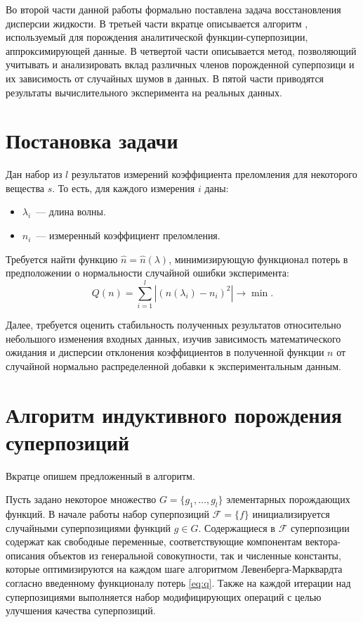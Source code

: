 \documentclass[12pt,a4paper]{article}
\begin{document}
Во второй части данной работы формально поставлена задача восстановления дисперсии
жидкости. В третьей части вкратце описывается алгоритм \cite{Rudoy13}, используемый
для порождения аналитической функции-суперпозиции, аппроксимирующей данные. В четвертой части
описывается метод, позволяющий учитывать и анализировать вклад различных членов
порожденной суперпозици и их зависимость от случайных шумов в данных. В пятой части
приводятся результаты вычислительного эксперимента на реальных данных.

\section{Постановка задачи}

Дан набор из $l$ результатов измерений коэффициента преломления для некоторого
вещества $s$. То есть, для каждого измерения $i$ даны:
\begin{itemize}
  \item $\lambda_i$~--- длина волны.
  \item $n_i$~--- измеренный коэффициент преломления.
\end{itemize}

Требуется найти функцию $\hat{n} = \hat{n}(\lambda)$, минимизирующую функционал
потерь в предположении о нормальности случайной ошибки эксперимента:
\begin{equation}
  Q(n) = \sum_{i = 1}^l \left| (n(\lambda_i) - n_i)^2 \right| \rightarrow \min.
  \label{eq:q}
\end{equation}

Далее, требуется оценить стабильность полученных результатов относительно
небольшого изменения входных данных, изучив зависимость математического ожидания
и дисперсии отклонения коэффициентов в полученной функции $n$ от случайной нормально
распределенной добавки к экспериментальным данным.

\section{Алгоритм индуктивного порождения суперпозиций}

Вкратце опишем предложенный в \cite{Rudoy13} алгоритм.

Пусть задано некоторое множество $G = \{ g_1, \dots, g_l \}$ элементарных
порождающих функций. В начале работы набор суперпозиций $\mathcal{F} = \{ f \}$
инициализируется случайными суперпозициями функций $g \in G$. Содержащиеся в
$\mathcal{F}$ суперпозиции содержат как свободные переменные, соответствующие
компонентам вектора-описания объектов из генеральной совокупности, так и численные
константы, которые оптимизируются на каждом шаге алгоритмом Левенберга-Марквардта
согласно введенному функционалу потерь \eqref{eq:q}. Также на каждой итерации
над суперпозициями выполняется набор модифицирующих операций с целью улучшения
качества суперпозиций.
\end{document}
